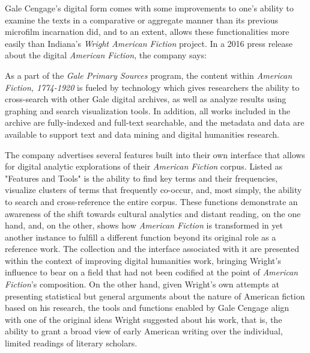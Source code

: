 Gale Cengage's digital form comes with some improvements to one's ability to examine the texts in a comparative or aggregate manner than its previous microfilm incarnation did, and to an extent, allows these functionalities more easily than Indiana's \textit{Wright American Fiction} project. In a 2016 press release about the digital \textit{American Fiction}, the company says:
\begin{displayquote}
As a part of the \textit{Gale Primary Sources} program, the content within \textit{American Fiction, 1774-1920} is fueled by technology which gives researchers the ability to cross-search with other Gale digital archives, as well as analyze results using graphing and search visualization tools. In addition, all works included in the archive are fully-indexed and full-text searchable, and the metadata and data are available to support text and data mining and digital humanities research.\autocite{noauthor_gale_2016-1}
\end{displayquote}
The company advertises several features built into their own interface that allows for digital analytic explorations of their \textit{American Fiction} corpus. Listed as "Features and Tools" is the ability to find key terms and their frequencies, visualize clusters of terms that frequently co-occur, and, most simply, the ability to search and cross-reference the entire corpus. These functions demonstrate an awareness of the shift towards cultural analytics and distant reading, on the one hand, and, on the other, shows how \textit{American Fiction} is transformed in yet another instance to fulfill a different function beyond its original role as a reference work. The collection and the interface associated with it are presented within the context of improving digital humanities work, bringing Wright's influence to bear on a field that had not been codified at the point of \textit{American Fiction}'s composition. On the other hand, given Wright's own attempts at presenting statistical but general arguments about the nature of American fiction based on his research, the tools and functions enabled by Gale Cengage align with one of the original ideas Wright suggested about his work, that is, the ability to grant a broad view of early American writing over the individual, limited readings of literary scholars.

